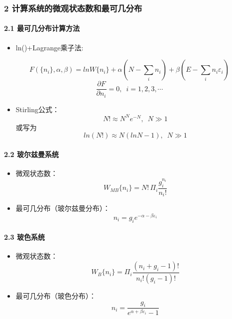 \documentclass[UTF8,twocolumn]{ctexart}
\providecommand{\tightlist}{%
  \setlength{\itemsep}{0pt}\setlength{\parskip}{0pt}}
\let\oldparagraph\paragraph
\renewcommand{\paragraph}[1]{\oldparagraph{#1}\mbox{}}
\begin{document}
\subsubsection{2
计算系统的微观状态数和最可几分布}\label{ux8ba1ux7b97ux7cfbux7edfux7684ux5faeux89c2ux72b6ux6001ux6570ux548cux6700ux53efux51e0ux5206ux5e03}

\paragraph{2.1
最可几分布计算方法}\label{ux6700ux53efux51e0ux5206ux5e03ux8ba1ux7b97ux65b9ux6cd5}

\begin{itemize}
  \tightlist
\item
  ln()+Lagrange乘子法:
\end{itemize}
  \[F(\{n_i\},\alpha,\beta)=lnW\{n_i\}+\alpha(N-\sum_in_i)+\beta(E-\sum_in_i\varepsilon_i)\]
\quad{} \[\frac{\partial F}{\partial n_i}=0,\,\,\,i=1,2,3,\cdots\]
\begin{itemize}
  \tightlist
\item
  Stirling公式： \[N!\approx N^Ne^{-N},\,\,\,N\gg1\] 或写为
  \[ln(N!)\approx N(lnN-1),\,\,\,N\gg1\]
\end{itemize}

\paragraph{2.2 玻尔兹曼系统}\label{ux73bbux5c14ux5179ux66fcux7cfbux7edf}

\begin{itemize}
\tightlist
\item
  微观状态数： \[W_{MB}\{n_i\}=N!\,\Pi_i\frac{g_i^{n_i}}{n_i!}\]
\item
  最可几分布（玻尔兹曼分布）： \[n_i=g_ie^{-\alpha-\beta\varepsilon_i}\]
\end{itemize}

\paragraph{2.3 玻色系统}\label{ux73bbux8272ux7cfbux7edf}

\begin{itemize}
\tightlist
\item
  微观状态数： \[W_B\{n_i\}=\Pi_i\frac{(n_i+g_i-1)!}{n_i!(g_i-1)!}\]
\item
  最可几分布（玻色分布）：
  \[n_i=\frac{g_i}{e^{\alpha+\beta\varepsilon_i}-1}\]
\end{itemize}
\end{document}
